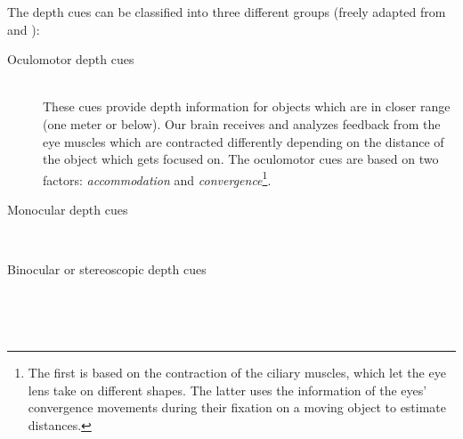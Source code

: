 The depth cues can be classified into three different groups (freely adapted from \cite{Goldstein.2015} and \cite[p.28 et seqq.]{Hottong.2009} ):
\begin{description}
\item [Oculomotor depth cues]\hfill \\ These cues provide depth information for objects which are in closer range (one meter or below). Our brain receives and analyzes feedback from the eye muscles which are contracted differently depending on the distance of the object which gets focused on. The oculomotor cues are based on two factors: \textit{accommodation} and \textit{convergence}\footnote{The first is based on the contraction of the ciliary muscles, which let the eye lens take on different shapes. The latter uses the information of the eyes' convergence movements during their fixation on a moving object to estimate distances.}.
\item [Monocular depth cues]\hfill \\
\item [Binocular or stereoscopic depth cues]\hfill \\
\end{description} 
  
\\


